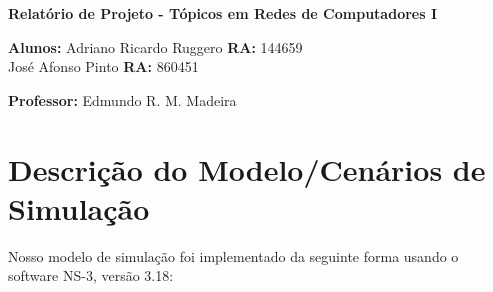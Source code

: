 \documentclass[12pt,twoside,a4paper]{article}
\begin{document}
\vskip 15mm

\begin{center} 
\textbf{Relatório de Projeto  - Tópicos em Redes de Computadores I}

\end{center}

\vskip 5mm

\textbf{Alunos:} Adriano Ricardo Ruggero \textbf{RA:} 144659\\
José Afonso Pinto \textbf{RA:} 860451



\textbf{Professor:} Edmundo R. M. Madeira

\vskip 20mm

\begin{abstract}



\end{abstract}

\newpage
\pagestyle{plain}
\headheight 0.0cm
\headsep 0.0cm
\footskip 2.2cm

\section{Descrição do Modelo/Cenários de Simulação}
\label{sec:01}
Nosso modelo de simulação foi implementado da seguinte forma usando o software NS-3, versão 3.18:
\end{document}
